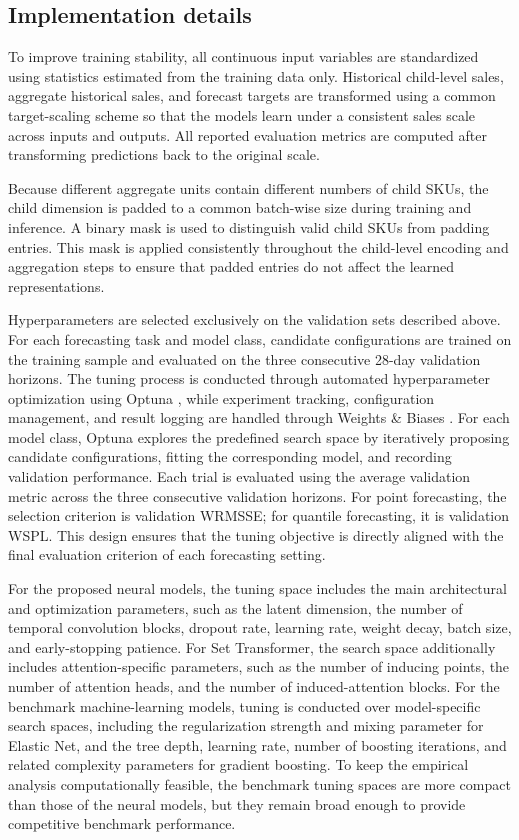 \documentclass[12pt]{article}
\begin{document}
\subsection{Implementation details}

To improve training stability, all continuous input variables are standardized using statistics estimated from the training data only. Historical child-level sales, aggregate historical sales, and forecast targets are transformed using a common target-scaling scheme so that the models learn under a consistent sales scale across inputs and outputs. All reported evaluation metrics are computed after transforming predictions back to the original scale.

Because different aggregate units contain different numbers of child SKUs, the child dimension is padded to a common batch-wise size during training and inference. A binary mask is used to distinguish valid child SKUs from padding entries. This mask is applied consistently throughout the child-level encoding and aggregation steps to ensure that padded entries do not affect the learned representations.

Hyperparameters are selected exclusively on the validation sets described above. For each forecasting task and model class, candidate configurations are trained on the training sample and evaluated on the three consecutive 28-day validation horizons. The tuning process is conducted through automated hyperparameter optimization using Optuna \parencite{akiba2019optuna}, while experiment tracking, configuration management, and result logging are handled through Weights \& Biases \parencite{biewald2020wandb}. For each model class, Optuna explores the predefined search space by iteratively proposing candidate configurations, fitting the corresponding model, and recording validation performance. Each trial is evaluated using the average validation metric across the three consecutive validation horizons. For point forecasting, the selection criterion is validation WRMSSE; for quantile forecasting, it is validation WSPL. This design ensures that the tuning objective is directly aligned with the final evaluation criterion of each forecasting setting.

For the proposed neural models, the tuning space includes the main architectural and optimization parameters, such as the latent dimension, the number of temporal convolution blocks, dropout rate, learning rate, weight decay, batch size, and early-stopping patience. For Set Transformer, the search space additionally includes attention-specific parameters, such as the number of inducing points, the number of attention heads, and the number of induced-attention blocks. For the benchmark machine-learning models, tuning is conducted over model-specific search spaces, including the regularization strength and mixing parameter for Elastic Net, and the tree depth, learning rate, number of boosting iterations, and related complexity parameters for gradient boosting. To keep the empirical analysis computationally feasible, the benchmark tuning spaces are more compact than those of the neural models, but they remain broad enough to provide competitive benchmark performance.
\end{document}
